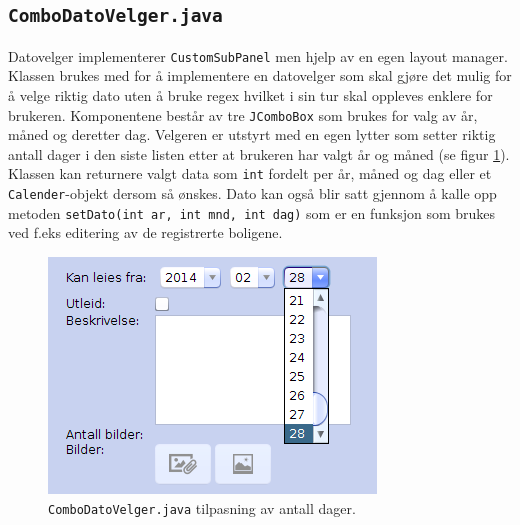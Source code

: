 \subsection{\texttt{ComboDatoVelger.java}}
Datovelger implementerer \texttt{CustomSubPanel} men hjelp av en egen layout manager. Klassen brukes med for å implementere en datovelger som skal gjøre det mulig for å velge riktig dato uten å bruke regex hvilket i sin tur skal oppleves enklere for brukeren. Komponentene består av tre \texttt{JComboBox} som brukes for valg av år, måned og deretter dag. Velgeren er utstyrt med en egen lytter som setter riktig antall dager i den siste listen etter at brukeren har valgt år og måned (se figur \ref{fig:combo_datovelger}).
Klassen kan returnere valgt data som \texttt{int} fordelt per år, måned og dag eller et \texttt{Calender}-objekt dersom så ønskes. Dato kan også blir satt gjennom å kalle opp metoden \texttt{setDato(int ar, int mnd, int dag)} som  er en funksjon som brukes ved f.eks editering av de registrerte boligene. 


\begin{figure}[ht]
\center
 \includegraphics[scale=0.5]{./img/produktdokumentasjon/swing_componenter/combo_datovelger.png}
 \caption[\texttt{ComboDatoVelger.java}]{\texttt{ComboDatoVelger.java} tilpasning av antall dager.}
 \label{fig:combo_datovelger}
\end{figure}


